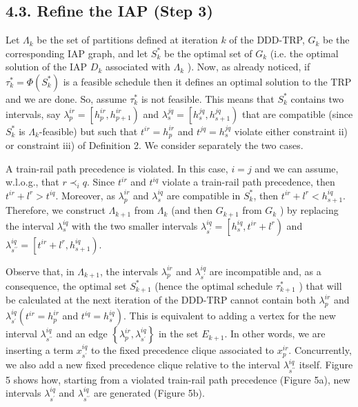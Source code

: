 \documentclass[10pt]{article}
\begin{document}
\subsection*{4.3. Refine the IAP (Step 3)}
Let $\Lambda_{k}$ be the set of partitions defined at iteration $k$ of the DDD-TRP, $G_{k}$ be the corresponding IAP graph, and let $S_{k}^{*}$ be the optimal set of $G_{k}$ (i.e. the optimal solution of the IAP $D_{k}$ associated with $\Lambda_{k}$ ). Now, as already noticed, if $\tau_{k}^{*}=\Phi\left(S_{k}^{*}\right)$ is a feasible schedule then it defines an optimal solution to the TRP and we are done. So, assume $\tau_{k}^{*}$ is not feasible. This means that $S_{k}^{*}$ contains two intervals, say $\lambda_{p}^{i r}=\left[h_{p}^{i r}, h_{p+1}^{i r}\right)$ and $\lambda_{s}^{j q}=\left[h_{s}^{j q}, h_{s+1}^{j q}\right)$ that are compatible (since $S_{k}^{*}$ is $\Lambda_{k}$-feasible) but such that $t^{i r}=h_{p}^{i r}$ and $t^{j q}=h_{s}^{j q}$ violate either constraint ii) or constraint iii) of Definition 2. We consider separately the two cases.

A train-rail path precedence is violated. In this case, $i=j$ and we can assume, w.l.o.g., that $r \prec_{i} q$. Since $t^{i r}$ and $t^{i q}$ violate a train-rail path precedence, then $t^{i r}+l^{r}>t^{i q}$. Moreover, as $\lambda_{p}^{i r}$ and $\lambda_{s}^{i q}$ are compatible in $S_{k}^{*}$, then $t^{i r}+l^{r}< h_{s+1}^{i q}$. Therefore, we construct $\Lambda_{k+1}$ from $\Lambda_{k}$ (and then $G_{k+1}$ from $G_{k}$ ) by replacing the interval $\lambda_{s}^{i q}$ with the two smaller intervals $\lambda_{s^{\prime}}^{i q}=\left[h_{s}^{i q}, t^{i r}+l^{r}\right)$ and $\lambda_{s^{\prime \prime}}^{i q}=\left[t^{i r}+l^{r}, h_{s+1}^{i q}\right)$.

Observe that, in $\Lambda_{k+1}$, the intervals $\lambda_{p}^{i r}$ and $\lambda_{s^{\prime}}^{i q}$ are incompatible and, as a consequence, the optimal set $S_{k+1}^{*}$ (hence the optimal schedule $\tau_{k+1}^{*}$ ) that will be calculated at the next iteration of the DDD-TRP cannot contain both $\lambda_{p}^{i r}$ and $\lambda_{s^{\prime}}^{i q}\left(t^{i r}=h_{p}^{i r}\right.$ and $\left.t^{i q}=h_{s}^{i q}\right)$. This is equivalent to adding a vertex for the new interval $\lambda_{s^{\prime \prime}}^{i q}$ and an edge $\left\{\lambda_{p}^{i r}, \lambda_{s^{\prime}}^{i q}\right\}$ in the set $E_{k+1}$. In other words, we are inserting a term $x_{s^{\prime}}^{i q}$ to the fixed precedence clique associated to $x_{p}^{i r}$. Concurrently, we also add a new fixed precedence clique relative to the interval $\lambda_{s^{\prime \prime}}^{i q}$ itself. Figure 5 shows how, starting from a violated train-rail path precedence (Figure 5a), new intervals $\lambda_{s^{\prime}}^{i q}$ and $\lambda_{s^{\prime \prime}}^{i q}$ are generated (Figure 5b).
\end{document}
